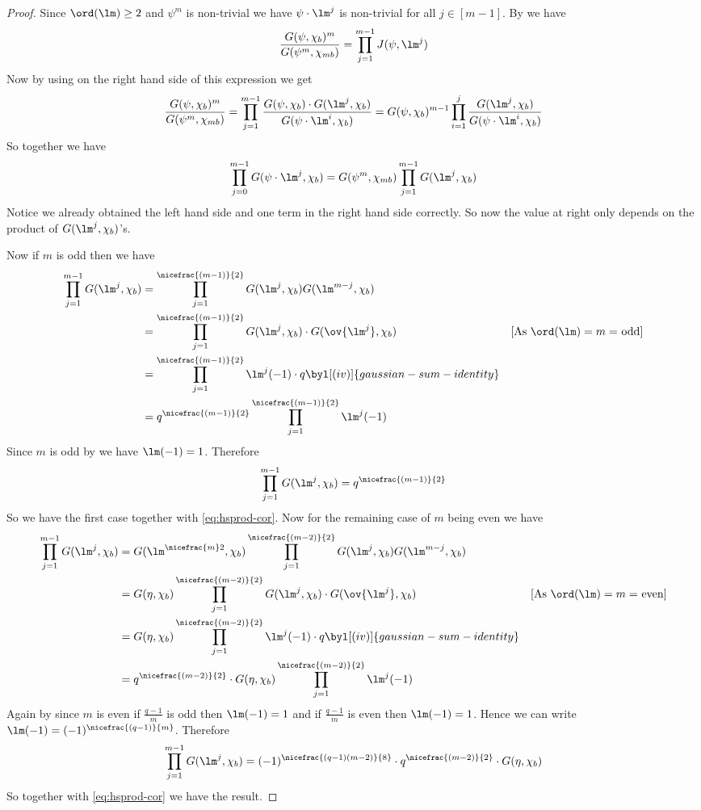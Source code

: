 \begin{proof}
  Since $\ord(\lm)\geq 2$ and $\psi^m$ is non-trivial we have $\psi\cdot \lm^j$ is non-trivial for all $j\in[m-1]$. By \DHprodthm we have $$\frac{G(\psi,\chi_b)^m}{G(\psi^m,\chi_{mb})}=\prod_{j=1}^{m-1}J(\psi,\lm^j)$$ Now by using  on the right hand side of this expression we get $$\frac{G(\psi,\chi_b)^m}{G(\psi^m,\chi_{mb})}=\prod_{j=1}^{m-1}\frac{G(\psi,\chi_b)\cdot G(\lm^j,\chi_b)}{G(\psi\cdot \lm^i,\chi_b)}=G(\psi,\chi_b)^{m-1}\prod_{i=1}^j \frac{G(\lm^j,\chi_b)}{G(\psi\cdot \lm^i,\chi_b)}$$So together we have \begin{equation}\label{eq:hsprod-cor}
    \prod_{j=0}^{m-1}G(\psi\cdot \lm^j,\chi_b)=G(\psi^m,\chi_{mb})\prod_{j=1}^{m-1}G(\lm^j,\chi_b)
  \end{equation}
  Notice we already obtained the left hand side and one term in the right hand side correctly. So now the value at right only depends on the product of $G(\lm^j,\chi_b)$'s.

  Now if $m$ is odd then we have \begin{align*}
    \prod_{j=1}^{m-1}G(\lm^j,\chi_b) & = \prod_{j=1}^{\nicefrac{(m-1)}{2}}G(\lm^j,\chi_b)G(\lm^{m-j},\chi_b)\\ 
    & = \prod_{j=1}^{\nicefrac{(m-1)}{2}}G(\lm^j,\chi_b)\cdot G(\ov{\lm^j},\chi_b) &[\text{As $\ord(\lm)=m=$ odd}]\\ 
    & = \prod_{j=1}^{\nicefrac{(m-1)}{2}} \lm^j(-1)\cdot q \byl[(iv)]{gaussian-sum-identity}\\ 
    & = q^{\nicefrac{(m-1)}{2}}\prod_{j=1}^{\nicefrac{(m-1)}{2}}\lm^j(-1)
  \end{align*}Since $m$ is odd by  we have $\lm(-1)=1$. Therefore $$\prod_{j=1}^{m-1}G(\lm^j,\chi_b)=q^{\nicefrac{(m-1)}{2}}$$ 
  So we have the first case together with \eqref{eq:hsprod-cor}. Now for the remaining case of $m$ being even we have \begin{align*}
    \prod_{j=1}^{m-1}G(\lm^j,\chi_b) & = G(\lm^{\nicefrac{m}2},\chi_b)\prod_{j=1}^{\nicefrac{(m-2)}{2}}G(\lm^j,\chi_b)G(\lm^{m-j},\chi_b)\\ 
    & = G(\eta,\chi_b)\prod_{j=1}^{\nicefrac{(m-2)}{2}}G(\lm^j,\chi_b)\cdot G(\ov{\lm^j},\chi_b) &[\text{As $\ord(\lm)=m=$ even}]\\ 
    & = G(\eta,\chi_b)\prod_{j=1}^{\nicefrac{(m-2)}{2}} \lm^j(-1)\cdot q \byl[(iv)]{gaussian-sum-identity}\\ 
    & = q^{\nicefrac{(m-2)}{2}}\cdot G(\eta,\chi_b)\prod_{j=1}^{\nicefrac{(m-2)}{2}}\lm^j(-1)
  \end{align*}
  Again by  since $m$ is even if $\frac{q-1}{m}$ is odd then $\lm(-1)=1$ and if $\frac{q-1}{m}$ is even then $\lm(-1)=1$. Hence we can write $\lm(-1)=(-1)^{\nicefrac{(q-1)}{m}}$. Therefore $$\prod_{j=1}^{m-1}G(\lm^j,\chi_b)=(-1)^{\nicefrac{(q-1)(m-2)}{8}}\cdot q^{\nicefrac{(m-2)}{2}}\cdot G(\eta,\chi_b)$$So together with \eqref{eq:hsprod-cor} we have the result. 
\end{proof}
